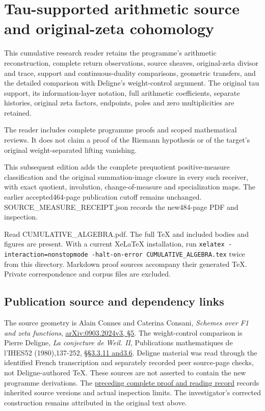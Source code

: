 \section{Tau-supported arithmetic source and original-zeta
cohomology}\label{tau-supported-arithmetic-source-and-original-zeta-cohomology}

This cumulative research reader retains the programme's arithmetic
reconstruction, complete return observations, source sheaves,
original-zeta divisor and trace, support and continuous-duality
comparisons, geometric transfers, and the detailed comparison with
Deligne's weight-control argument. The original tau support, its
information-layer notation, full arithmetic coefficients, separate
histories, original zeta factors, endpoints, poles and zero
multiplicities are retained.

The reader includes complete programme proofs and scoped mathematical
reviews. It does not claim a proof of the Riemann hypothesis or of the
target's original weight-separated lifting vanishing.

This subsequent edition adds the complete prequotient positive-measure
classification and the original summation-image closure in every such
receiver, with exact quotient, involution, change-of-measure and
specialization maps. The earlier accepted464-page publication cutoff
remains unchanged. SOURCE\_MEASURE\_RECEIPT.json records the new484-page
PDF and inspection.

Read CUMULATIVE\_ALGEBRA.pdf. The full TeX and included bodies and
figures are present. With a current XeLaTeX installation, run
\texttt{xelatex\ -interaction=nonstopmode\ -halt-on-error\ CUMULATIVE\_ALGEBRA.tex}
twice from this directory. Markdown proof sources accompany their
generated TeX. Private correspondence and corpus files are excluded.

\subsection{Publication source and dependency
links}\label{publication-source-and-dependency-links}

The source geometry is Alain Connes and Caterina Consani, \emph{Schemes
over F1 and zeta functions},
\href{https://arxiv.org/abs/0903.2024v3}{arXiv:0903.2024v3, §5}. The
weight-control comparison is Pierre Deligne, \emph{La conjecture de
Weil. II}, Publications mathematiques de l'IHES52 (1980),137-252,
\href{https://www.numdam.org/item/PMIHES_1980__52__137_0/}{§§3.3.11
and3.6}. Deligne material was read through the identified French
transcription and separately recorded peer source-page checks, not
Deligne-authored TeX. These sources are not asserted to contain the new
programme derivations. The
\href{https://github.com/KokunoYumeto/zeta-function-research-reader/blob/36a82ecca98addb8a98b48204e349737856c7223/workbenches/splitzero-tandem/continuations/20260924-cohomology-weight-and-character-lifts/BUILD_AND_REVIEW.md}{preceding
complete proof and reading record} records inherited source versions and
actual inspection limits. The investigator's corrected construction
remains attributed in the original text above.
